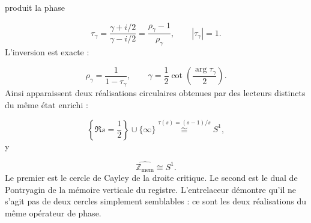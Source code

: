 produit la phase\par
\[
\tau_\gamma
=
\frac{\gamma+i/2}{\gamma-i/2}
=
\frac{\rho_\gamma-1}{\rho_\gamma},
\qquad
|\tau_\gamma|=1.
\]
L'inversion est exacte :\par
\[
\rho_\gamma=\frac{1}{1-\tau_\gamma},
\qquad
\gamma
=
\frac12\cot\left(\frac{\arg\tau_\gamma}{2}\right).
\]
Ainsi apparaissent deux réalisations circulaires obtenues par des lecteurs distincts du même état enrichi :\par
\[
\left\{\Re s=\frac12\right\}\cup\{\infty\}
\overset{\tau(s)=(s-1)/s}{\cong}
S^1,
\]
y\par
\[
\widehat{\mathbb Z_{\mathrm{mem}}}
\cong S^1.
\]
Le premier est le cercle de Cayley de la droite critique. Le second est le dual de Pontryagin de la mémoire verticale du registre. L'entrelaceur démontre qu'il ne s'agit pas de deux cercles simplement semblables : ce sont les deux réalisations du même opérateur de phase.\par
{}
